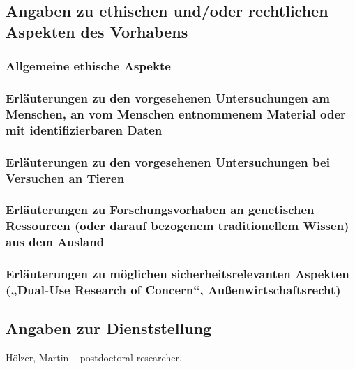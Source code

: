 \documentclass[ngerman]{scrartcl}
\begin{document}
\subsection{Angaben zu ethischen und/oder rechtlichen Aspekten des Vorhabens}

\subsubsection{Allgemeine ethische Aspekte}

\subsubsection{Erläuterungen zu den vorgesehenen Untersuchungen am Menschen, an vom Menschen entnommenem Material oder mit identifizierbaren Daten}

\subsubsection{Erläuterungen zu den vorgesehenen Untersuchungen bei Versuchen an Tieren}

\subsubsection{Erläuterungen zu Forschungsvorhaben an genetischen Ressourcen (oder 
darauf bezogenem traditionellem Wissen) aus dem Ausland}

\subsubsection{Erläuterungen zu möglichen sicherheitsrelevanten Aspekten („Dual-Use 
Research of Concern``, Außenwirtschaftsrecht)}


\subsection{Angaben zur Dienststellung}
H\"olzer, Martin -- postdoctoral researcher, 
\end{document}

